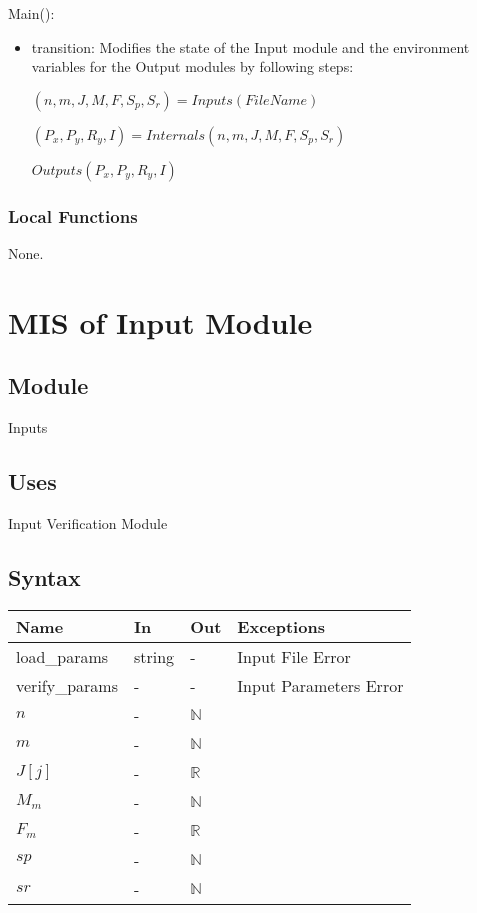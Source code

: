 \documentclass[12pt, titlepage]{article}
\begin{document}
\noindent Main():  
\begin{itemize}
\item transition: Modifies the state of the Input module and the environment variables for the Output modules by following steps:


$(n,m,J,M,F,S_p,S_r)=Inputs(FileName)$

$(P_x,P_y,R_y,I)=Internals(n,m,J,M,F,S_p,S_r)$

$Outputs(P_x,P_y,R_y,I)$



\end{itemize}

\subsubsection{Local Functions}

None.
\section{MIS of Input Module \label{mInput} }

\subsection{Module}

Inputs 

\subsection{Uses}
Input Verification Module

\subsection{Syntax}
\begin{tabular}{p{3cm} p{1cm} p{1cm} >{\raggedright\arraybackslash}p{9cm}}
\toprule
\textbf{Name} & \textbf{In} & \textbf{Out} & \textbf{Exceptions} \\
\midrule
load\_params & string & - &  Input File Error \\
verify\_params & - & - & Input Parameters Error\\
$n$ & -& $\mathbb{N}$ \\
$m$ & -& $\mathbb{N}$\\
$J[j ]\,$ & -& $\mathbb{R}$\\
$M_m$ & - & $\mathbb{N}$\\
$F_m$ & - & $\mathbb{R}$\\
$sp$ & - & $\mathbb{N}$\\
$sr$ & - & $\mathbb{N}$\\
\bottomrule
\end{tabular}
\end{document}

